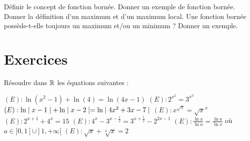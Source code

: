 \begin{exercise}[subtitle=Majorants et minorants, extype=cours]
	\begin{tasks} 
		\task Définir le concept de fonction bornée.
		\task Donner un exemple de fonction bornée.
		\task Donner la définition d'un maximum et d'un maximum local.
		\task Une fonction bornée possède-t-elle toujours un maximum et/ou un minimum ? Donner un exemple. 
	\end{tasks}
\end{exercise}



\section{Exercices}



\begin{exercise}[subtitle= Résolution d'équations, difficulty=*]
	Résoudre dans $\mathbb{R}$ les équations suivantes :
		\begin{tasks}
		\task $(E): \ln(x^2-1)+\ln(4)=\ln(4x-1)$
		\task $(E): 2^{x^2}=3^{x^3}$
		\task $(E): \ln \mid x-1 \mid + \ln \mid x-2 \mid = \ln \mid 4x^2 + 3x-7 \mid$
		\task $(E): x^{\sqrt{x}}=\sqrt{x}^x$
	    \task $(E): 2^{x+1}+4^x = 15$
		\task $(E): 4^x - 3^{x-\frac{1}{2}} = 3^{x+\frac{1}{2}} -2^{2x-1}$ 
		\task $(E): \frac{\ln x}{\ln a} =\frac{\ln a}{\ln x}$ où $a\in ]0,1[\cup]1, +\infty[$
		\task $(E) : \sqrt{x} + \sqrt[3]{x}=2$
		\end{tasks}
\end{exercise}

